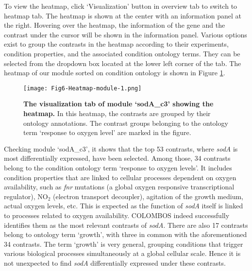 \begin{small}
To view the heatmap, click `Visualization' button in overview tab to switch to
heatmap tab.  The heatmap is shown at the center with an information panel at
the right. Hovering over the heatmap, the information of the gene and the
contrast under the cursor will be shown in the information panel. Various
options exist to group the contrasts in the heatmap according to their
experiments, condition properties, and the associated condition ontology
terms. They can be selected from the dropdown box located at the lower left
corner of the tab. The heatmap of our module sorted on condition ontology is
shown in Figure \ref{fig:colombos-heatmap-m1}.

\end{small} %

\begin{figure}[tb]
	\centering
  	\texttt{[image: Fig6-Heatmap-module-1.png]}
	\caption[Heatmap of module `sodA\_c3']{\textbf{The visualization tab of 
	module `sodA\_c3' showing the heatmap.}
	In this heatmap, the contrasts are grouped by their ontology annotations. 
	The contrast groups belonging to the ontology term `response to oxygen 
	level' are marked in the figure.}
	\label{fig:colombos-heatmap-m1}
\end{figure}

Checking module `sodA\_c3', it shows that the top 53 contrasts, where
\textit{sodA} is most differentially expressed, have been selected. Among
those, 34 contrasts belong to the condition ontology term `response to oxygen
levels'.  It includes condition properties that are linked to cellular
processes dependent on oxygen availability, such as \textit{fnr} mutations (a
global oxygen responsive transcriptional regulator), NO$_2$ (electron
transport decoupler), agitation of the growth medium, actual oxygen levels,
etc. This is expected as the function of \textit{sodA} itself is linked to processes related
to oxygen availability.
COLOMBOS indeed successfully identifies them as the most relevant contrasts of
\textit{sodA}. 
%
There are also 17 contrasts belong to ontology term `growth', with three in
common with the aforementioned 34 contrasts. The term `growth' is very
general, grouping conditions that trigger various biological processes
simultaneously at a global cellular scale. Hence it is not unexpected to find
\textit{sodA} differentially expressed under these contrasts.




